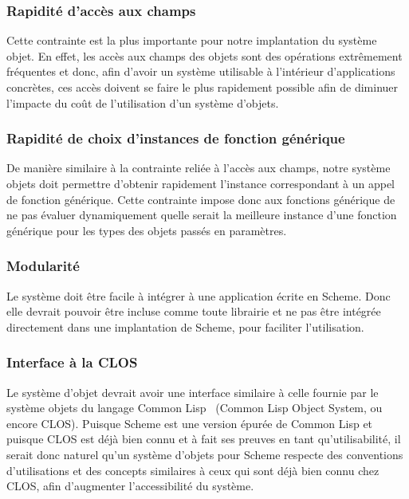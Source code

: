     \subsubsection{Rapidité d'accès aux champs}
      Cette contrainte est la plus importante pour notre implantation
      du système objet. En effet, les accès aux champs des objets sont
      des opérations extrêmement fréquentes et donc, afin d'avoir un
      système utilisable à l'intérieur d'applications concrètes, ces
      accès doivent se faire le plus rapidement possible afin de
      diminuer l'impacte du coût de l'utilisation d'un système
      d'objets.

    \subsubsection{Rapidité de choix d'instances de fonction générique}
      De manière similaire à la contrainte reliée à l'accès aux
      champs, notre système objets doit permettre d'obtenir rapidement
      l'instance correspondant à un appel de fonction générique. Cette
      contrainte impose donc aux fonctions générique de ne pas évaluer
      dynamiquement quelle serait la meilleure instance d'une fonction
      générique pour les types des objets passés en paramètres.

    \subsubsection{Modularité}
      Le système doit être facile à intégrer à une application écrite
      en Scheme. Donc elle devrait pouvoir être incluse comme toute
      librairie et ne pas être intégrée directement dans une
      implantation de Scheme, pour faciliter l'utilisation.

    \subsubsection{Interface à la CLOS}
      Le système d'objet devrait avoir une interface similaire à celle
      fournie par le système objets du langage Common
      Lisp~\cite{COMMONLISP} (Common Lisp Object System, ou encore
      CLOS). Puisque Scheme est une version épurée de Common Lisp et
      puisque CLOS est déjà bien connu et à fait ses preuves en tant
      qu'utilisabilité, il serait donc naturel qu'un système d'objets
      pour Scheme respecte des conventions d'utilisations et des
      concepts similaires à ceux qui sont déjà bien connu chez CLOS,
      afin d'augmenter l'accessibilité du système.
    
